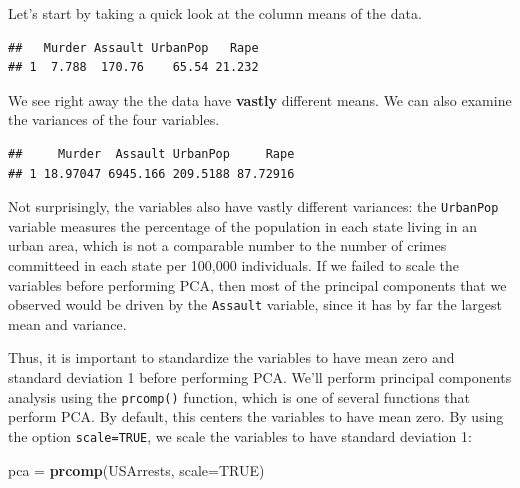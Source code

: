 \documentclass[
  openany]{book}
\newenvironment{Shaded}{\begin{snugshade}}{\end{snugshade}}
\newcommand{\DataTypeTok}[1]{\textcolor[rgb]{0.13,0.29,0.53}{#1}}
\newcommand{\KeywordTok}[1]{\textcolor[rgb]{0.13,0.29,0.53}{\textbf{#1}}}
\newcommand{\NormalTok}[1]{#1}
\newcommand{\OperatorTok}[1]{\textcolor[rgb]{0.81,0.36,0.00}{\textbf{#1}}}
\newcommand{\OtherTok}[1]{\textcolor[rgb]{0.56,0.35,0.01}{#1}}
\newcommand{\StringTok}[1]{\textcolor[rgb]{0.31,0.60,0.02}{#1}}
\begin{document}
Let's start by taking a quick look at the column means of the data.

\begin{Shaded}
\end{Shaded}

\begin{verbatim}
##   Murder Assault UrbanPop   Rape
## 1  7.788  170.76    65.54 21.232
\end{verbatim}

We see right away the the data have \textbf{vastly} different means. We can also examine the variances of the four variables.

\begin{Shaded}
\end{Shaded}

\begin{verbatim}
##     Murder  Assault UrbanPop     Rape
## 1 18.97047 6945.166 209.5188 87.72916
\end{verbatim}

Not surprisingly, the variables also have vastly different variances: the
\texttt{UrbanPop} variable measures the percentage of the population in each state
living in an urban area, which is not a comparable number to the number
of crimes committeed in each state per 100,000 individuals. If we failed to scale the
variables before performing PCA, then most of the principal components
that we observed would be driven by the \texttt{Assault} variable, since it has by
far the largest mean and variance.

Thus, it is important to standardize the
variables to have mean zero and standard deviation 1 before performing
PCA. We'll perform principal components analysis using the \texttt{prcomp()} function, which is one of several functions that perform PCA. By default, this centers the variables to have mean zero. By using the option \texttt{scale=TRUE}, we scale the variables to have standard
deviation 1:

\begin{Shaded}
\begin{Highlighting}[]
\NormalTok{pca =}\StringTok{ }\KeywordTok{prcomp}\NormalTok{(USArrests, }\DataTypeTok{scale=}\OtherTok{TRUE}\NormalTok{)}
\end{Highlighting}
\end{Shaded}
\end{document}
